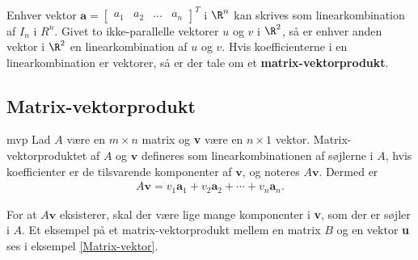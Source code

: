 %
%
Enhver vektor 
$
\textbf{a}=
\begin{bmatrix}
a_1 & a_2 & \ldots & a_n
\end{bmatrix}^T
$
i $\R^n$ kan skrives som linearkombination af $I_n$ i $R^n$. 
Givet to ikke-parallelle vektorer $u$ og $v$ i $\R^2$, så er enhver anden vektor i $\R^2$ en linearkombination af $u$ og $v$. 
Hvis koefficienterne i en linearkombination er vektorer, så er der tale om et \textbf{matrix-vektorprodukt}.
%
%
%
%
\subsection{Matrix-vektorprodukt}
\begin{defn}{}{mvp}
Lad $A$ være en $m \times n$ matrix og \textbf{v} være en $n \times 1$ vektor. 
Matrix-vektorproduktet af $A$ og $\textbf{v}$ defineres som linearkombinationen af søjlerne i $A$, hvis koefficienter er de tilsvarende komponenter af $\textbf{v}$, og noteres $A\textbf{v}$. 
Dermed er
\begin{align*}
A\textbf{v} =v_1\textbf{a}_1 + v_2\textbf{a}_2 + \cdots + v_n\textbf{a}_n.
\end{align*}
\end{defn}
\noindent
For at $A\textbf{v}$ eksisterer, skal der være lige mange komponenter i \textbf{v}, som der er søjler i $A$. 
Et eksempel på et matrix-vektorprodukt mellem en matrix $B$ og en vektor \textbf{u} ses i eksempel \ref{Matrix-vektor}.
\\
%
